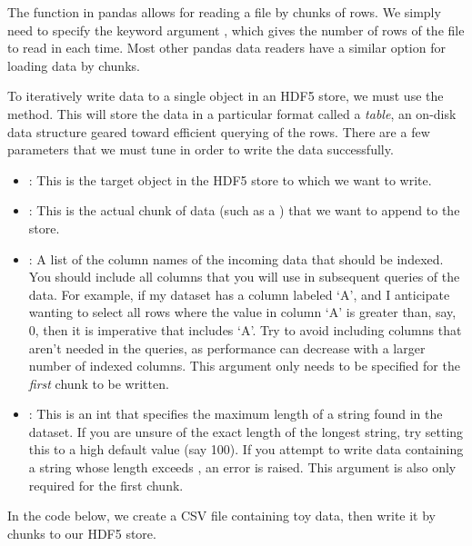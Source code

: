 The  function in pandas allows for reading a file by chunks of rows. We simply need to specify the keyword argument
, which gives the number of rows of the file to read in each time. Most other pandas data readers have a similar
option for loading data by chunks.

To iteratively write data to a single object in an HDF5 store, we must use the  method. This will store the data in a 
particular format called a \emph{table}, an on-disk data structure geared toward efficient querying of the rows. There are a few
parameters that we must tune in order to write the data successfully.
\begin{itemize}
\item {}: This is the target object in the HDF5 store to which we want to write. 
\item {}: This is the actual chunk of data (such as a ) that we want to append to the store.
\item {}: A list of the column names of the incoming data that should be indexed. You should include all 
columns that you will use in subsequent queries of the data. For example, if my dataset has a column labeled `A', and I anticipate
wanting to select all rows where the value in column `A' is greater than, say, 0, then it is imperative that  includes
`A'. Try to avoid including columns that aren't needed in the queries, as performance can decrease with a larger number of indexed
columns. This argument only needs to be specified for the \emph{first} chunk to be written.
\item {}: This is an int that specifies the maximum length of a string found in the dataset. If you are unsure of the 
exact length of the longest string, try setting this to a high default value (say 100). If you attempt to write data containing 
a string whose length exceeds , an error is raised. This argument is also only required for the first chunk.
\end{itemize}
In the code below, we create a CSV file containing toy data, then write it by chunks to our HDF5 store.

